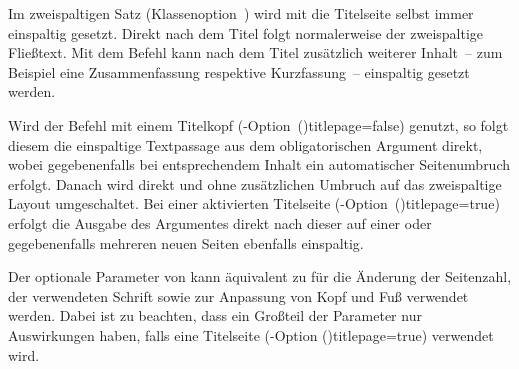 \begin{DeclareEntity*}{}
\begin{DeclareEntity*}{}
\begin{DeclareEntity*}{}
\begin{Declaration}
Im zweispaltigen Satz
(Klassenoption~)
wird mit  die Titelseite selbst immer einspaltig gesetzt. 
Direkt nach dem Titel folgt normalerweise der zweispaltige Fließtext. Mit dem 
Befehl  kann nach dem Titel zusätzlich weiterer 
Inhalt~-- zum Beispiel eine Zusammenfassung respektive Kurzfassung~-- 
einspaltig gesetzt werden.

Wird der Befehl mit einem Titelkopf 
(\KOMAScript-Option~\Option(){titlepage=false})
genutzt, so folgt diesem die einspaltige Textpassage aus dem obligatorischen 
Argument direkt, wobei gegebenenfalls bei entsprechendem Inhalt ein 
automatischer Seitenumbruch erfolgt. Danach wird direkt und ohne zusätzlichen 
Umbruch auf das zweispaltige Layout umgeschaltet.
Bei einer aktivierten Titelseite 
(\KOMAScript-Option~\Option(){titlepage=true})
erfolgt die Ausgabe des Argumentes  direkt nach dieser 
auf einer oder gegebenenfalls mehreren neuen Seiten ebenfalls einspaltig. 

Der optionale Parameter von  kann äquivalent zu 
 für die Änderung der Seitenzahl, der verwendeten Schrift 
sowie zur Anpassung von Kopf und Fuß verwendet werden. Dabei ist zu beachten, 
dass ein Großteil der Parameter nur Auswirkungen haben, falls eine Titelseite
(\KOMAScript-Option \Option(){titlepage=true})
verwendet wird.
\end{Declaration}


\end{DeclareEntity*}
\end{DeclareEntity*}
\end{DeclareEntity*}
